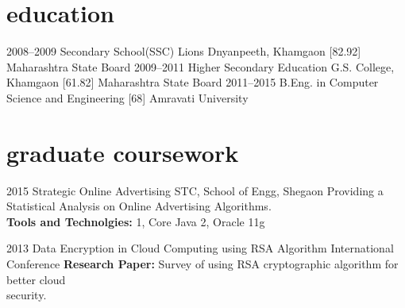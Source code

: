 \documentclass[]{cv-style}          %
\begin{document}

\section{education}

\begin{entrylist}

\entry
{2008--2009}
{Secondary School(SSC) {\normalfont Lions Dnyanpeeth, Khamgaon [82.92]}}
{Maharashtra State Board}
{\vspace{-0.3cm}}
\entry
{2009--2011}
{Higher Secondary Education {\normalfont G.S. College, Khamgaon [61.82]}}
{Maharashtra State Board}
{\vspace{-0.3cm}}
\entry
{2011--2015}
{B.Eng. {\normalfont in Computer Science and Engineering [68]}}
{Amravati University}
{ }
\end{entrylist}


\section{graduate coursework}

\begin{entrylist}
\entry
{2015}
{Strategic Online Advertising} 
{STC, School of Engg, Shegaon}
{ Providing a Statistical Analysis on Online Advertising Algorithms. \\
  \textbf{Tools and Technolgies:} 1, Core Java 2, Oracle 11g}

\entry
{2013}
{Data Encryption in Cloud Computing using RSA Algorithm}
{International Conference}
{\textbf{Research Paper:} Survey of using RSA cryptographic algorithm for better cloud \\ security.}
{\vspace{-0.3cm}}
\end{entrylist}
\end{document}
